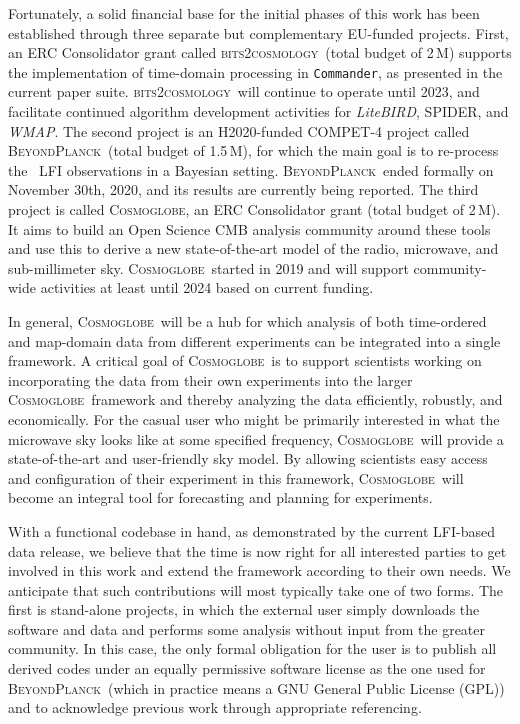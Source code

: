 \documentclass[twocolumn]{aa}
\def\commander{\texttt{Commander}}
\newcommand{\BP}{\textsc{BeyondPlanck}}
\newcommand{\cosmoglobe}{\textsc{Cosmoglobe}}
\newcommand{\btoc}{\textsc{bits2cosmology}}
\begin{document}
Fortunately, a solid financial base for the initial phases of this work has been established through three separate but complementary EU-funded projects. First, an ERC Consolidator grant called \btoc\ (total budget of 2\,M\texteuro) supports the implementation of time-domain processing in \commander, as presented in the current paper suite. \btoc\ will continue to operate until 2023, and facilitate continued algorithm development activities for \textit{LiteBIRD}, SPIDER, and \textit{WMAP}. The second project is an H2020-funded COMPET-4 project called \BP\ (total budget of 1.5\,M\texteuro), for which the main goal is to re-process the \Planck\ LFI observations in a Bayesian setting. \BP\ ended formally on November 30th, 2020, and its results are currently being reported. The third project is called \cosmoglobe, an ERC Consolidator grant (total budget of 2\,M\texteuro). It aims to build an Open Science CMB analysis community around these tools and use this to derive a new state-of-the-art model of the radio, microwave, and sub-millimeter sky. \cosmoglobe\ started in 2019 and will support community-wide activities at least until 2024 based on current funding.

In general, \cosmoglobe\ will be a hub for which analysis of both time-ordered and map-domain data from different experiments can be integrated into a single framework. A critical goal of \cosmoglobe\ is to support scientists working on incorporating the data from their own experiments into the larger \cosmoglobe\ framework and thereby analyzing the data efficiently, robustly, and economically. For the casual user who might be primarily interested in what the microwave sky looks like at some specified frequency, \cosmoglobe\ will provide a state-of-the-art and user-friendly sky model. By allowing scientists easy access and configuration of their experiment in this framework, \cosmoglobe\ will become an integral tool for forecasting and planning for experiments.

With a functional codebase in hand, as demonstrated by the current LFI-based data release, we believe that the time is now right for all interested parties to get involved in this work and extend the framework according to their own needs. We anticipate that such contributions will most typically take one of two forms. The first is stand-alone projects, in which the external user simply downloads the software and data and performs some analysis without input from the greater community. In this case, the only formal obligation for the user is to publish all derived codes under an equally permissive software license as the one used for \BP\ (which in practice means a GNU General Public License (GPL)) and to acknowledge previous work through appropriate referencing.
\end{document}
